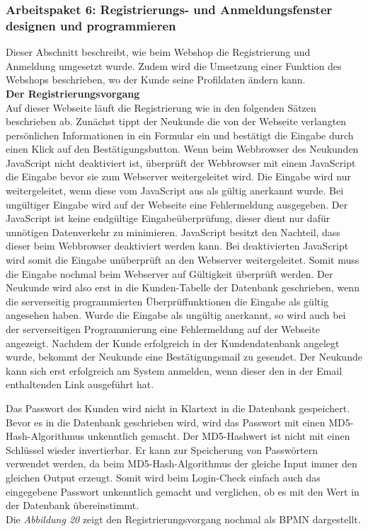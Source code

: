 \newpage
\subsubsection{Arbeitspaket 6: Registrierungs- und Anmeldungsfenster designen und programmieren}
Dieser Abschnitt beschreibt, wie beim Webshop die Registrierung und Anmeldung umgesetzt wurde. Zudem wird die Umsetzung einer Funktion des Webshops beschrieben, wo der Kunde seine Profildaten ändern kann.\\

\textbf{Der Registrierungsvorgang}\\
Auf dieser Webseite läuft die Registrierung wie in den folgenden Sätzen beschrieben ab. Zunächst tippt der Neukunde die von der Webseite verlangten persönlichen Informationen in ein Formular ein und bestätigt die Eingabe durch einen Klick auf den Bestätigungsbutton. Wenn beim Webbrowser des Neukunden JavaScript nicht deaktiviert ist, überprüft der Webbrowser mit einem JavaScript die Eingabe bevor sie zum Webserver weitergeleitet wird. Die Eingabe wird nur weitergeleitet, wenn diese vom JavaScript aus als gültig anerkannt wurde. Bei ungültiger Eingabe wird auf der Webseite eine Fehlermeldung ausgegeben. Der JavaScript ist keine endgültige Eingabeüberprüfung, dieser dient nur dafür unnötigen Datenverkehr zu minimieren. JavaScript besitzt den Nachteil, dass dieser beim Webbrowser deaktiviert werden kann. Bei deaktivierten JavaScript wird somit die Eingabe unüberprüft an den Webserver weitergeleitet. Somit muss die Eingabe nochmal beim Webserver auf Gültigkeit überprüft werden.  Der Neukunde wird also erst in die Kunden-Tabelle der Datenbank geschrieben, wenn die serverseitig programmierten Überprüffunktionen die Eingabe als gültig angesehen haben. Wurde die Eingabe als ungültig anerkannt, so wird auch bei der serverseitigen Programmierung eine Fehlermeldung auf der Webseite angezeigt. Nachdem der Kunde erfolgreich in der Kundendatenbank angelegt wurde, bekommt der Neukunde eine Bestätigungsmail zu gesendet. Der Neukunde kann sich erst erfolgreich am System anmelden, wenn dieser den in der Email enthaltenden Link ausgeführt hat. 

Das Passwort des Kunden wird nicht in Klartext in die Datenbank gespeichert. Bevor es in die Datenbank geschrieben wird, wird das Passwort mit einen \glqq MD5-Hash-Algorithmus\grqq{} unkenntlich gemacht. Der MD5-Hashwert ist nicht mit einen Schlüssel wieder invertierbar. Er kann zur Speicherung von Passwörtern verwendet werden, da beim \glqq MD5-Hash-Algorithmus\grqq{} der gleiche Input immer den gleichen Output erzeugt. Somit wird beim Login-Check einfach auch das eingegebene Passwort unkenntlich gemacht und verglichen, ob es mit den Wert in der Datenbank übereinstimmt.\\ Die \textit{Abbildung 20} zeigt den Registrierungsvorgang nochmal als BPMN dargestellt.\\

